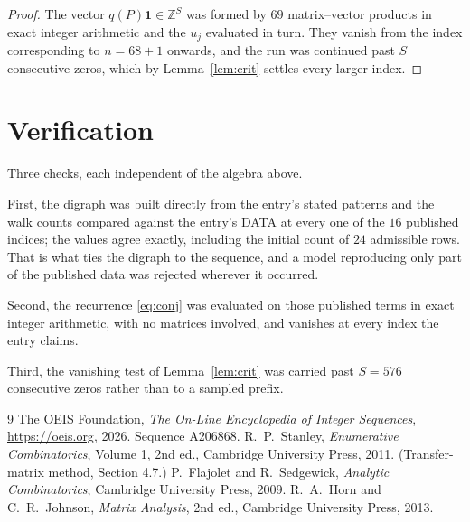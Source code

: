 \documentclass[11pt,a4paper]{article}
\theoremstyle{plain}
\theoremstyle{definition}
\begin{document}
\begin{proof}
The vector $q(P)\mathbf{1}\in\mathbb{Z}^{S}$ was formed by $69$ matrix--vector
products in exact integer arithmetic and the $u_j$ evaluated in turn. They vanish from the
index corresponding to $n=68+1$ onwards, and the run was continued past $S$ consecutive
zeros, which by Lemma~\ref{lem:crit} settles every larger index.
\end{proof}

\section{Verification}

Three checks, each independent of the algebra above.

First, the digraph was built directly from the entry's stated patterns and the walk counts
compared against the entry's DATA at every one of the $16$ published indices; the
values agree exactly, including the initial count of $24$ admissible rows. That is
what ties the digraph to the sequence, and a model reproducing only part of the published
data was rejected wherever it occurred.

Second, the recurrence \eqref{eq:conj} was evaluated on those published terms in exact
integer arithmetic, with no matrices involved, and vanishes at every index the entry claims.

Third, the vanishing test of Lemma~\ref{lem:crit} was carried past $S=576$ consecutive
zeros rather than to a sampled prefix.

\begin{thebibliography}{9}
 The OEIS Foundation, \emph{The On-Line Encyclopedia of Integer
Sequences}, \url{https://oeis.org}, 2026. Sequence A206868.
 R.~P.~Stanley, \emph{Enumerative Combinatorics}, Volume 1, 2nd ed.,
Cambridge University Press, 2011. (Transfer-matrix method, Section 4.7.)
 P.~Flajolet and R.~Sedgewick, \emph{Analytic Combinatorics}, Cambridge
University Press, 2009.
 R.~A.~Horn and C.~R.~Johnson, \emph{Matrix Analysis}, 2nd ed., Cambridge
University Press, 2013.
\end{thebibliography}
\end{document}
